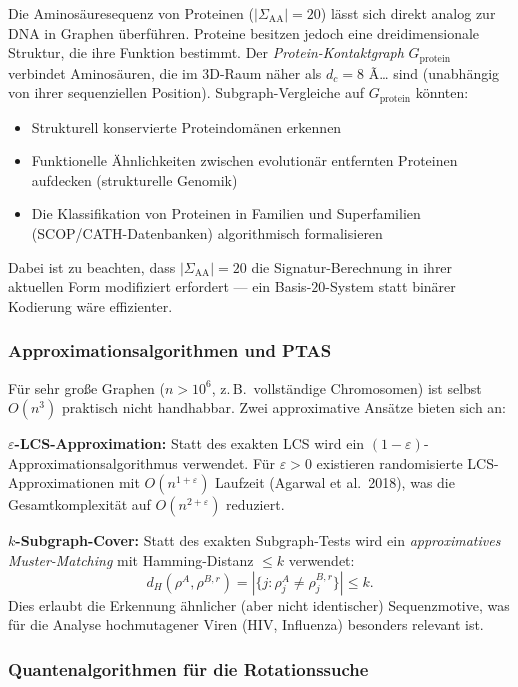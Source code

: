 ﻿\documentclass[a4paper,12pt]{article}
\theoremstyle{definition}
\begin{document}
Die Aminosäuresequenz von Proteinen ($|\Sigma_{\text{AA}}| = 20$) lässt sich
direkt analog zur DNA in Graphen überführen. Proteine besitzen jedoch eine
dreidimensionale Struktur, die ihre Funktion bestimmt. Der
\textit{Protein-Kontaktgraph} $G_{\text{protein}}$ verbindet Aminosäuren,
die im 3D-Raum näher als $d_c = 8$ Ã… sind (unabhängig von ihrer sequenziellen
Position). Subgraph-Vergleiche auf $G_{\text{protein}}$ könnten:
\begin{itemize}
	\item Strukturell konservierte Proteindomänen erkennen
	\item Funktionelle Ähnlichkeiten zwischen evolutionär entfernten Proteinen
	aufdecken (strukturelle Genomik)
	\item Die Klassifikation von Proteinen in Familien und Superfamilien
	(SCOP/CATH-Datenbanken) algorithmisch formalisieren
\end{itemize}
Dabei ist zu beachten, dass $|\Sigma_{\text{AA}}| = 20$ die
Signatur-Berechnung in ihrer aktuellen Form modifiziert erfordert ---
ein Basis-$20$-System statt binärer Kodierung wäre effizienter.

\subsubsection{Approximationsalgorithmen und PTAS}

Für sehr große Graphen ($n > 10^6$, z.\,B.\ vollständige Chromosomen) ist
selbst $O(n^3)$ praktisch nicht handhabbar. Zwei approximative Ansätze
bieten sich an:

\textbf{$\varepsilon$-LCS-Approximation:} Statt des exakten LCS wird ein
$(1-\varepsilon)$-Approximationsalgo\-rithmus verwendet. Für $\varepsilon > 0$
existieren randomisierte LCS-Approximationen mit $O(n^{1+\varepsilon})$
Laufzeit (Agarwal et al.\ 2018), was die Gesamtkomplexität auf
$O(n^{2+\varepsilon})$ reduziert.

\textbf{$k$-Subgraph-Cover:} Statt des exakten Subgraph-Tests wird ein
\textit{approximatives Muster-Matching} mit Hamming-Distanz $\leq k$ verwendet:
\[
d_H(\rho^A, \rho^{B,r}) = |\{j : \rho_j^A \neq \rho_j^{B,r}\}| \leq k.
\]
Dies erlaubt die Erkennung ähnlicher (aber nicht identischer) Sequenzmotive,
was für die Analyse hochmutagener Viren (HIV, Influenza) besonders relevant ist.

\subsubsection{Quantenalgorithmen für die Rotationssuche}
\end{document}
